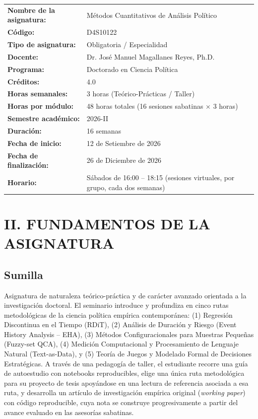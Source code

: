 \documentclass[11pt,a4paper]{article}
\begin{document}
\noindent\begin{tabularx}{\textwidth}{>{\bfseries}p{6.2cm}X}
Nombre de la asignatura: & Métodos Cuantitativos de Análisis Político \\
Código: & D4S10122 \\
Tipo de asignatura: & Obligatoria / Especialidad \\
Docente: & Dr. José Manuel Magallanes Reyes, Ph.D. \\
Programa: & Doctorado en Ciencia Política \\
Créditos: & 4.0 \\
Horas semanales: & 3 horas (Teórico-Prácticas / Taller) \\
Horas por módulo: & 48 horas totales (16 sesiones sabatinas $\times$ 3 horas) \\
Semestre académico: & 2026-II \\
Duración: & 16 semanas \\
Fecha de inicio: & 12 de Setiembre de 2026 \\
Fecha de finalización: & 26 de Diciembre de 2026 \\
Horario: & Sábados de 16:00 -- 18:15 (sesiones virtuales, por grupo, cada dos semanas) \\
\end{tabularx}

\section{II. FUNDAMENTOS DE LA ASIGNATURA}

\subsection{Sumilla}
Asignatura de naturaleza teórico-práctica y de carácter avanzado orientada a la investigación doctoral. El seminario introduce y profundiza en cinco rutas metodológicas de la ciencia política empírica contemporánea: (1) Regresión Discontinua en el Tiempo (RDiT), (2) Análisis de Duración y Riesgo (Event History Analysis -- EHA), (3) Métodos Configuracionales para Muestras Pequeñas (Fuzzy-set QCA), (4) Medición Computacional y Procesamiento de Lenguaje Natural (Text-as-Data), y (5) Teoría de Juegos y Modelado Formal de Decisiones Estratégicas. A través de una pedagogía de taller, el estudiante recorre una guía de autoestudio con notebooks reproducibles, elige una única ruta metodológica para su proyecto de tesis apoyándose en una lectura de referencia asociada a esa ruta, y desarrolla un artículo de investigación empírica original (\textit{working paper}) con código reproducible, cuya nota se construye progresivamente a partir del avance evaluado en las asesorías sabatinas.
\end{document}
